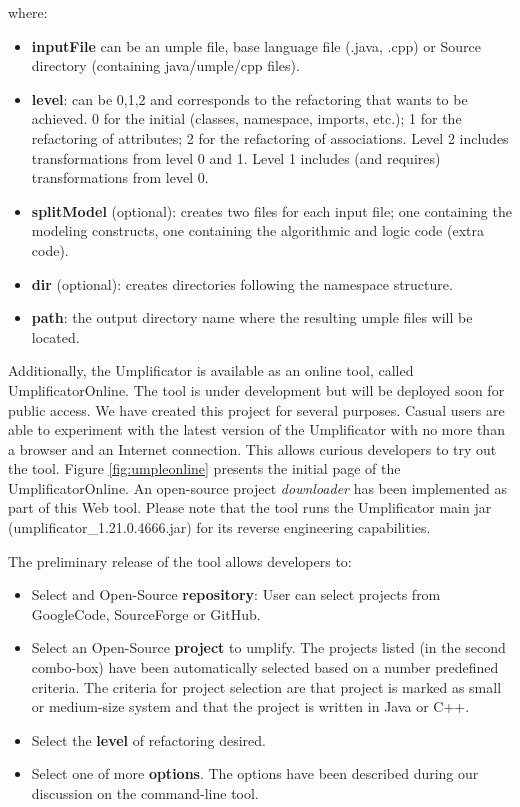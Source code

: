where:
\begin{itemize}
\item \textbf{inputFile} can be an umple file, base language file (.java, .cpp) or Source directory (containing java/umple/cpp files).
\item \textbf{level}: can be 0,1,2 and corresponds to the refactoring that wants to be achieved. 0 for the initial (classes, namespace, imports, etc.); 1 for the refactoring of attributes; 2 for the refactoring of associations. Level 2 includes transformations from level 0 and 1. Level 1 includes (and requires) transformations from level 0.
\item \textbf{splitModel} (optional): creates two files for each input file; one containing the modeling constructs, one containing the algorithmic and logic code (extra code). 
\item \textbf{dir} (optional): creates directories following the namespace structure.
\item \textbf{path}: the output directory name where the resulting umple files will be located.
\end{itemize}

Additionally, the Umplificator is available as an online tool, called UmplificatorOnline. The tool is under development but will be deployed soon for public access. We have created this project for several purposes. Casual users are able to experiment with the latest version of the Umplificator with no more than a browser and an Internet connection. This allows curious developers to try out the tool. Figure \ref{fig:umpleonline} presents the initial page of the UmplificatorOnline.
An open-source project \textit{downloader} has been implemented as part of this Web tool. Please note that the tool runs the  Umplificator main jar (umplificator\_1.21.0.4666.jar) for its reverse engineering capabilities. 

The preliminary release of the tool allows developers to:

\begin{itemize}
\item Select and Open-Source \textbf{repository}: User can select projects from GoogleCode, SourceForge or GitHub.
\item Select an Open-Source \textbf{project} to umplify. The projects listed (in the second combo-box) have been automatically selected based on a number predefined criteria. The criteria for project selection are that project is marked as small or medium-size system and that the project is written in Java or C++.
\item Select the \textbf{level} of refactoring desired.
\item Select one of more \textbf{options}. The options have been described during our discussion on the command-line tool.
\end{itemize}

